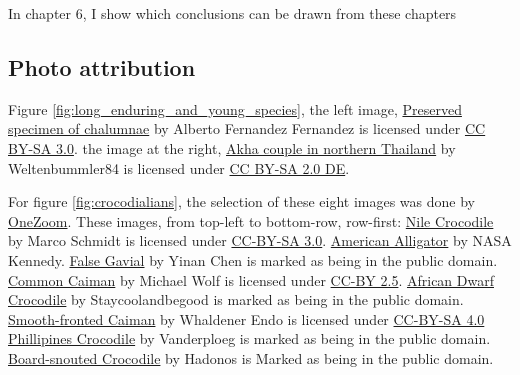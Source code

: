 In chapter 6, I show which conclusions can be drawn from these chapters


\subsection{Photo attribution}

Figure \ref{fig:long_enduring_and_young_species},
the left image,
\href{https://en.wikipedia.org/wiki/File:Latimeria_Chalumnae_-_Coelacanth_-_NHMW.jpg}{Preserved specimen of chalumnae}
by Alberto Fernandez Fernandez
is licensed under \href{https://creativecommons.org/licenses/by-sa/3.0/deed.en}{CC BY-SA 3.0}.
the image at the right,
\href{https://commons.wikimedia.org/wiki/File:Akha_cropped_hires.JPG}{Akha couple in northern Thailand}
by Weltenbummler84
is licensed under \href{https://creativecommons.org/licenses/by-sa/2.0/de/deed.en}{CC BY-SA 2.0 DE}.

For figure \ref{fig:crocodialians},
the selection of these eight images was done by 
\href{https://www.onezoom.org/life.html/@Crocodylia=195672\#x1602,y148,w4.1516}{OneZoom}.
These images, from top-left to bottom-row, row-first:
\href{http://media.eol.org/content/2018/04/11/13/61270_orig.jpg}{Nile Crocodile}
by Marco Schmidt
is licensed under \href{http://creativecommons.org/licenses/by-sa/3.0}{CC-BY-SA 3.0}.
\href{https://www.flickr.com/photos/nasakennedy/14159295507}{American Alligator}
by NASA Kennedy.
\href{http://media.eol.org/content/2014/10/06/10/58393_orig.jpg}{False Gavial}
by Yinan Chen
is marked as being in the public domain.
\href{http://media.eol.org/content/2012/06/13/05/87714_orig.jpg}{Common Caiman}
by Michael Wolf
is licensed under \href{http://creativecommons.org/licenses/by/2.5}{CC-BY 2.5}.
\href{http://media.eol.org/content/2013/06/11/03/12146_orig.jpg}{African Dwarf Crocodile}
by Staycoolandbegood
is marked as being in the public domain.
\href{http://media.eol.org/content/2013/11/25/21/58484_orig.jpg}{Smooth-fronted Caiman}
by Whaldener Endo
is licensed under \href{http://creativecommons.org/licenses/by-sa/4.0}{CC-BY-SA 4.0}
\href{http://media.eol.org/content/2013/06/11/03/06619_orig.jpg}{Phillipines Crocodile}
by Vanderploeg
is marked as being in the public domain.
\href{http://media.eol.org/content/2014/10/06/16/93746_orig.jpg}{Board-snouted Crocodile}
by Hadonos
is Marked as being in the public domain.

